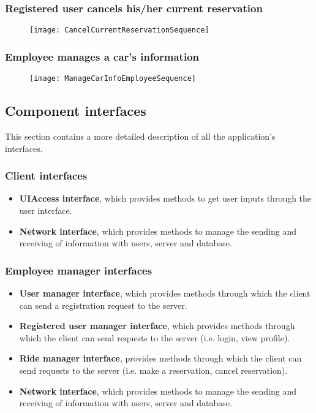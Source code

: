 \subsubsection{Registered user cancels his/her current reservation}
\begin{figure}[H]
	\centering
	\texttt{[image: CancelCurrentReservationSequence]}
\end{figure}
\subsubsection{Employee manages a car's information}
\begin{figure}[H]
	\centering
	\texttt{[image: ManageCarInfoEmployeeSequence]}
\end{figure}
\newpage
\subsection{Component interfaces} 
This section contains a more detailed description of all the application's interfaces.
\subsubsection{Client interfaces}
\begin{itemize}
	\item \textbf{UIAccess interface}, which provides methods to get user inputs through the user interface.
	\item \textbf{Network interface}, which provides methods to manage the sending and receiving of information with users, server and database.
\end{itemize}
\subsubsection{Employee manager interfaces}
\begin{itemize}
	\item \textbf{User manager interface}, which provides methods through which the client can send a registration request to the server.
	\item \textbf{Registered user manager interface}, which provides methods through which the client can send requests to the server (i.e. login, view profile).
	\item \textbf{Ride manager interface}, provides methods through which the client can send requests to the server (i.e. make a reservation, cancel reservation).
	\item \textbf{Network interface}, which provides methods to manage the sending and receiving of information with users, server and database.
\end{itemize}

